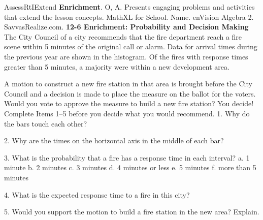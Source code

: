 \documentclass{article}
\newenvironment{te-addendum}[2]{}{}     %
\newcommand{\answer}[1]{}               %
\newcommand{\placeholder}[2]{}          %
\newcommand{\te}[1]{}                   %
\begin{document}
\begin{te-addendum}{Assess}{RtIExtend}
\textbf{Enrichment}. O, A.
Presents engaging problems and activities that extend the lesson concepts.
MathXL for School. Name. enVision Algebra 2. SavvasRealize.com.
\textbf{12-6 Enrichment: Probability and Decision Making}
The City Council of a city recommends that the fire department reach a fire scene within 5 minutes of the original call or alarm. Data for arrival times during the previous year are shown in the histogram. Of the fires with response times greater than 5 minutes, a majority were within a new development area.
\placeholder{graph}{Gray histogram. Horizontal axis Response Times (min), integer labels 1 to 7 centered below contiguous unit-width bars; vertical axis Number of Fires, ticks 0,20,40,60,80 with horizontal grid lines. Bar heights for 1 through 7 minutes: 20,40,80,60,50,60,50.}
A motion to construct a new fire station in that area is brought before the City Council and a decision is made to place the measure on the ballot for the voters. Would you vote to approve the measure to build a new fire station? You decide!
Complete Items 1--5 before you decide what you would recommend.
1. Why do the bars touch each other?
\answer{Sample answer: The time intervals are continuous.}
2. Why are the times on the horizontal axis in the middle of each bar?
\answer{Sample answer: The intervals are from 30 seconds before to 30 seconds after the number of minutes.}
3. What is the probability that a fire has a response time in each interval?
a. 1 minute \answer{(\frac{20}{360})}
b. 2 minutes \answer{(\frac{40}{360})}
c. 3 minutes \answer{(\frac{80}{360})}
d. 4 minutes or less \answer{(\frac{200}{360})}
e. 5 minutes \answer{(\frac{50}{360})}
f. more than 5 minutes \answer{(\frac{110}{360})}
\te{Printed interval descriptions use rounded minute categories: ``4 minutes or less'' includes the bin through 4.5 minutes, and ``more than 5 minutes'' starts at 5.5 minutes.}
4. What is the expected response time to a fire in this city?
\answer{about 4.3 minutes}
5. Would you support the motion to build a fire station in the new area? Explain.
\answer{Sample answer: No, because the expected response time is less than 5 minutes.}
\te{enVision Algebra 2 • Teaching Resources. Copyright © Savvas Learning Company LLC. All Rights Reserved.}
\end{te-addendum}
\end{document}
